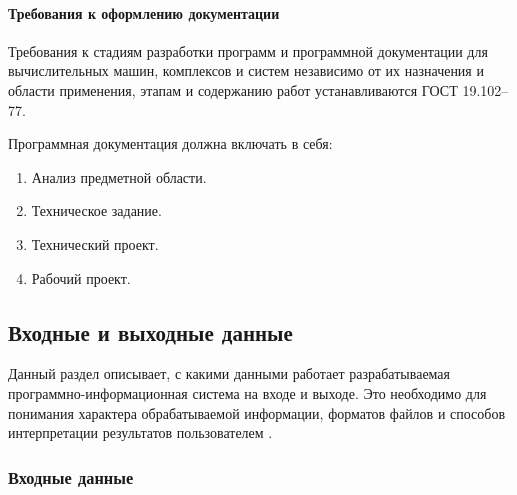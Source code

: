 \paragraph{Требования к оформлению документации}

Требования к стадиям разработки программ и программной документации для вычислительных машин, комплексов и систем независимо от их назначения и области применения, этапам и содержанию работ устанавливаются ГОСТ 19.102–77.

Программная документация должна включать в себя:
\begin{enumerate}
	\item Анализ предметной области.
	\item Техническое задание.
	\item Технический проект.
	\item Рабочий проект.	
\end{enumerate}
\subsection{Входные и выходные данные}

Данный раздел описывает, с какими данными работает разрабатываемая программно-информационная система на входе и выходе. Это необходимо для понимания характера обрабатываемой информации, форматов файлов и способов интерпретации результатов пользователем \cite{dawson2021}.
\subsubsection{Входные данные}

